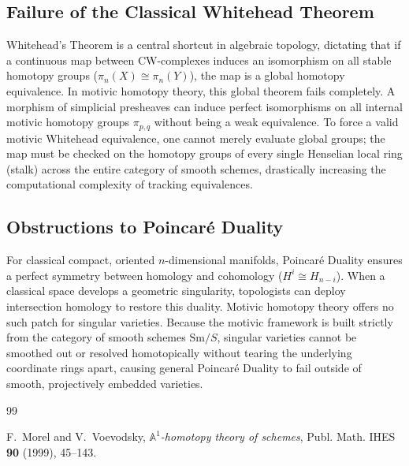 \documentclass[11pt,oneside]{article}
\begin{document}
\subsection{Failure of the Classical Whitehead Theorem}
Whitehead's Theorem is a central shortcut in algebraic topology, dictating that if a continuous map between CW-complexes induces an isomorphism on all stable homotopy groups ($\pi_n(X) \cong \pi_n(Y)$), the map is a global homotopy equivalence. In motivic homotopy theory, this global theorem fails completely. A morphism of simplicial presheaves can induce perfect isomorphisms on all internal motivic homotopy groups $\pi_{p,q}$ without being a weak equivalence. To force a valid motivic Whitehead equivalence, one cannot merely evaluate global groups; the map must be checked on the homotopy groups of every single Henselian local ring (stalk) across the entire category of smooth schemes, drastically increasing the computational complexity of tracking equivalences.

\subsection{Obstructions to Poincaré Duality}
For classical compact, oriented $n$-dimensional manifolds, Poincaré Duality ensures a perfect symmetry between homology and cohomology ($H^i \cong H_{n-i}$). When a classical space develops a geometric singularity, topologists can deploy intersection homology to restore this duality. Motivic homotopy theory offers no such patch for singular varieties. Because the motivic framework is built strictly from the category of smooth schemes $\text{Sm}/S$, singular varieties cannot be smoothed out or resolved homotopically without tearing the underlying coordinate rings apart, causing general Poincaré Duality to fail outside of smooth, projectively embedded varieties.
\begin{thebibliography}{99}

F.~Morel and V.~Voevodsky,
\emph{$\mathbb{A}^1$-homotopy theory of schemes},
Publ. Math. IHES \textbf{90} (1999), 45--143.
\end{thebibliography}
\end{document}

